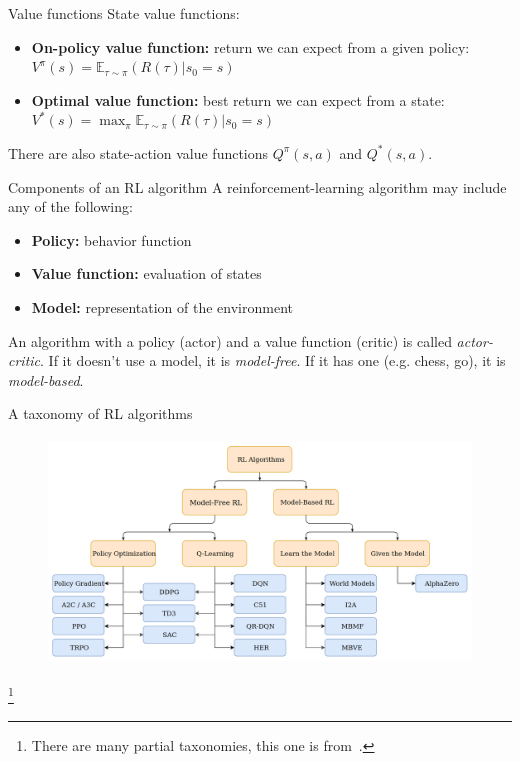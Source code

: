 \documentclass[11pt, aspectratio=169]{beamer}
\newcommand\blfootnote[1]{%
  \begingroup
  \renewcommand\thefootnote{}%
  \footnote{#1}%
  \addtocounter{footnote}{-1}%
  \endgroup
}
\begin{document}
\begin{frame}{Value functions}
    State value functions:
    \begin{itemize}
        \item \textbf{On-policy value function:} return we can expect from a given policy: $V^\pi(s) = \mathbb{E}_{\tau \sim \pi}(R(\tau) | s_0 = s)$
        \item \textbf{Optimal value function:} best return we can expect from a state: $V^*(s) = \max_\pi \mathbb{E}_{\tau \sim \pi}(R(\tau) | s_0 = s)$
    \end{itemize}
    There are also state-action value functions $Q^\pi(s, a)$ and $Q^*(s, a)$.
\end{frame}

\begin{frame}{Components of an RL algorithm}
    A reinforcement-learning algorithm may include any of the following:
    \begin{itemize}
        \item \textbf{Policy:} behavior function
        \item \textbf{Value function:} evaluation of states
        \item \textbf{Model:} representation of the environment
    \end{itemize}
    An algorithm with a policy (actor) and a value function (critic) is called \emph{actor-critic}. If it doesn't use a model, it is \emph{model-free}. If it has one (e.g. chess, go), it is \emph{model-based}.
\end{frame}

\begin{frame}{A taxonomy of RL algorithms}
    \begin{figure}
        \includegraphics[height=6cm]{figures/taxonomy.png}
    \end{figure}
    \blfootnote{
        There are many partial taxonomies, this one is from~\cite{spinningup}.
    }
\end{frame}
\end{document}
